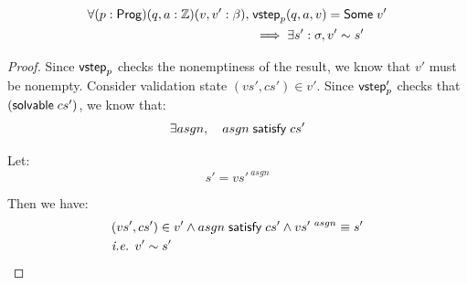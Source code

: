 \begin{lemma}[\ref{eq:rc1}]
\begin{align*}
\forall(p:\mathsf{Prog})(q,a:\mathbb Z)(v,v':\beta),\;&\mathsf{vstep}_p(q,a,v)=\mathsf{Some}\;v'\\
&\implies\exists s':\sigma,v'\sim s'
\end{align*}
\begin{proof}
Since $\mathsf{vstep}_p$ checks the nonemptiness of the result, we know that $v'$ must
be nonempty.  Consider validation state $(vs',cs')\in v'$.  Since $\mathsf{vstep}'_p$
checks that $(\mathsf{solvable}\; cs')$, we know that:
\[\exists asgn,\quad asgn\;\mathsf{satisfy}\;cs'\]

Let:
\[s'=vs'^{~asgn}\]

Then we have:
\begin{align*}
&(vs',cs')\in v'\wedge asgn\;\mathsf{satisfy}\;cs'\wedge vs'^{~asgn}\equiv s'\\
&\textit{i.e. }v'\sim s'
\end{align*}
\end{proof}
\end{lemma}

